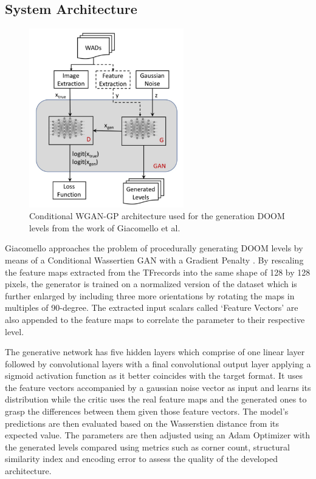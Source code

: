 \documentclass{Configuration_Files/PoliMi3i_thesis}
\begin{document}
\subsection{System Architecture}

\begin{figure}
    \includegraphics[width=0.6\textwidth]{cWGAN.jpg}
    \caption[Conditional WGAN-GP architecture from the work of Giacomello et al.]{Conditional WGAN-GP architecture used for the generation DOOM levels from the work of Giacomello et al.}
    \label{fig:cwgan}
\end{figure}

Giacomello approaches the problem of procedurally generating DOOM levels by means of a Conditional 
Wassertien GAN with a Gradient Penalty \cite{EdG18}. By rescaling the feature maps extracted from the 
TFrecords into the same shape of 128 by 128 pixels, the generator is trained on a normalized version of 
the dataset which is further enlarged by including three more orientations by rotating the maps 
in multiples of 90-degree. The extracted input scalars called ‘Feature Vectors’ are also 
appended to the feature maps to correlate the parameter to their respective level. 

The generative network has five hidden layers which comprise of one linear layer followed by 
convolutional layers with a final convolutional output layer applying a sigmoid activation 
function as it better coincides with the target format. It uses the feature vectors 
accompanied by a gaussian noise vector as input and learns its distribution while the 
critic uses the real feature maps and the generated ones to grasp the differences
between them given those feature vectors. The model’s predictions are then 
evaluated based on the Wasserstien distance from its expected value. The parameters 
are then adjusted using an Adam Optimizer with the generated levels compared 
using metrics such as corner count, structural similarity index and encoding error to 
assess the quality of the developed architecture.
\end{document}
